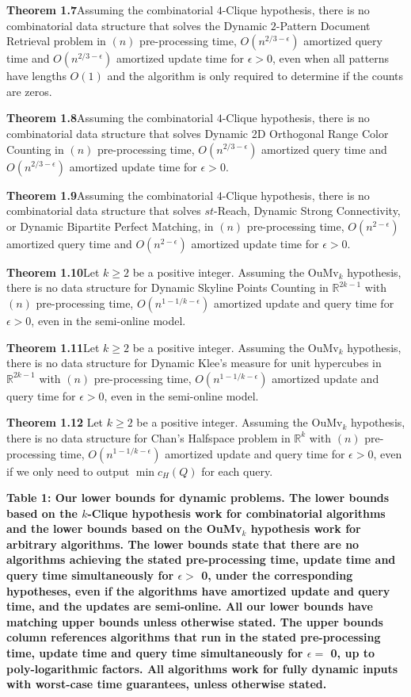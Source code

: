 \documentclass[preprint,10pt]{elsarticle}
\begin{document}
\begin{multicols}{2}
\textbf{Theorem 1.7}\label{1.7}Assuming the combinatorial $4$-Clique hypothesis, there is no combinatorial data structure that solves the Dynamic $2$-Pattern Document Retrieval problem in $(n)$ pre-processing time, $O(n^{2/3-\epsilon})$ amortized query time and $O(n^{2/3-\epsilon})$ amortized update time for $\epsilon > 0$, even when all patterns have lengths $O(1)$ and the algorithm is only required to determine if the counts are zeros. 


  

\textbf{Theorem 1.8}\label{1.8}Assuming the combinatorial $4$-Clique hypothesis, there is no combinatorial data structure that solves Dynamic 2D Orthogonal Range Color Counting in $(n)$ pre-processing time, $O(n^{2/3-\epsilon})$ amortized query time and $O(n^{2/3-\epsilon})$ amortized update time for $\epsilon > 0$.  

\textbf{Theorem 1.9}\label{1.9}Assuming the combinatorial $4$-Clique hypothesis, there is no combinatorial data structure that solves $st$-Reach, Dynamic Strong Connectivity, or Dynamic Bipartite Perfect Matching, in $(n)$ pre-processing time, $O(n^{2-\epsilon})$ amortized query time and $O(n^{2-\epsilon})$ amortized update time for $\epsilon > 0$.  

\textbf{Theorem 1.10}\label{1.10}Let $k \ge 2$ be a positive integer. 
Assuming the OuMv$_k$ hypothesis, there is no data structure for Dynamic Skyline Points Counting in $\mathbb{R}^{2k-1}$ with $(n)$ pre-processing time, $O(n^{1-1/k -\epsilon})$ amortized update and query time for $\epsilon > 0$, even in the semi-online model. 

\textbf{Theorem 1.11}\label{1.11}Let $k \ge 2$ be a positive integer. 
Assuming the OuMv$_k$ hypothesis, there is no data structure for Dynamic Klee's measure for unit hypercubes in $\mathbb{R}^{2k-1}$ with $(n)$ pre-processing time, $O(n^{1-1/k -\epsilon})$ amortized update and query time for $\epsilon > 0$, even in the semi-online model. 


\textbf{Theorem 1.12}\label{1.12} Let $k \ge 2$ be a positive integer. 
Assuming the OuMv$_k$ hypothesis, there is no data structure for Chan's Halfspace problem in $\mathbb{R}^{k}$ with $(n)$ pre-processing time, $O(n^{1-1/k -\epsilon})$ amortized update and query time for $\epsilon > 0$, even if we only need to output  $\min c_H(Q)$ for each query.
 
\end{multicols}
\textbf{Table 1: Our lower bounds for dynamic problems. The lower bounds based on the $k$-Clique hypothesis work for combinatorial
algorithms and the lower bounds based on the OuMv$_k$ hypothesis work for arbitrary algorithms.
The lower bounds state that there are no algorithms achieving the stated pre-processing time, update time and query time
simultaneously for $\epsilon>$ 0, under the corresponding hypotheses, even if the algorithms have amortized update and query time,
and the updates are semi-online.
All our lower bounds have matching upper bounds unless otherwise stated. The upper bounds column references algorithms
that run in the stated pre-processing time, update time and query time simultaneously for $\epsilon=$ 0, up to poly-logarithmic factors.
All algorithms work for fully dynamic inputs with worst-case time guarantees, unless otherwise stated.}
\end{document}
